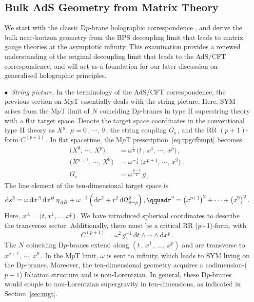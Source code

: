 \documentclass[11pt]{article}
\newcommand{\be}{\begin{equation}}
\newcommand{\ee}{\end{equation}}
\renewcommand{\emph}[1]{\textit{#1}}
\newcommand{\dd}{\mathrm{d}}
\begin{document}
\subsection{Bulk AdS Geometry from Matrix Theory} \label{sec:badsmt}

We start with the classic D$p$-brane holographic correspondence \cite{Maldacena:1997re,Itzhaki:1998dd}, and derive the bulk near-horizon geometry from the BPS decoupling limit that leads to matrix gauge theories at the asymptotic infinity. This examination provides a renewed understanding of the original decoupling limit that leads to the AdS/CFT correspondence, and will act as a foundation for our later discussion on generalised holographic principles.  

\vspace{3mm}

\noindent $\bullet$~\emph{String picture.}
In the terminology of the AdS/CFT correspondence, the previous section on M$p$T essentially deals with the string picture. Here, SYM arises from the M$p$T limit of $N$ coinciding D$p$-branes in type II superstring theory with a flat target space. Denote the target space coordinates in the conventional type II theory as $X^\mu$, $\mu = 0\,, \, \cdots, \, 9$\,, the string coupling $G^{}_\text{s}$\,, and the RR $(p+1)$-form $C^{(p+1)}$\,.
In flat spacetime, the M$p$T prescription~\eqref{eq:rpgcfbmpt} becomes
%
\begin{subequations} \label{eq:mptp}
\begin{align}
    \bigl( X^0, \, \cdots, \, X^p \bigr) & = \omega^{\frac{1}{2}} \, \bigl( t\,, \, x^1,\, \cdots, \, x^p \bigr)\,, \\[4pt]
    \bigl( X^{p+1}, \, \cdots, \, X^9 \bigr) & = \omega^{- \frac{1}{2}} \, \bigl( x^{p+1}, \, \cdots, \, x^9 \bigr)\,, \\[4pt]
    G^{}_\text{s} & = \omega^{\frac{p-3}{2}} \, g^{}_\text{s}\,
\end{align}
\end{subequations}
%
The line element of the ten-dimensional target space is
%
\be
    \dd s^2 = \omega \, \dd x^A \, \dd x^B \, \eta^{}_{AB} 
    + \omega^{-1} \, \Bigl( \, \dd r^2 + r^2 \, \dd \Omega^2_{8-p} \Bigr)\,,
        \qquad%
    r^2 = \bigl( x^{p+1} \bigr)^2 + \cdots + \bigl( x^9 \bigr)^2\,.
\ee
%
Here, $x^A = (t,x^1,\dots,x^p$)\,. We have introduced spherical coordinates to describe the transverse sector. Additionally, there must be a critical RR ($p$+1)-form, with
%
\be
    C^{(p+1)} = \omega^2 \, g^{-1}_\text{s} \, \dd t \wedge \cdots \wedge \dd x^{p}\,.
\ee
% 
The $N$ coinciding D$p$-branes extend along $(t\,, \, x^1\,, \, \dots,\, x^p)$ and are transverse to $x^{p+1}, \, \cdots, \, x^9$\,. In the M$p$T limit, $\omega$ is sent to infinity, which leads to SYM living on the D$p$-branes. Moreover, the ten-dimensional geometry acquires a codimension-($p+1$) foliation structure and is non-Lorentzian. In general, these D$p$-branes would couple to non-Lorentzian supergravity in ten-dimensions, as indicated in Section~\ref{sec:mgt}.
\end{document}
